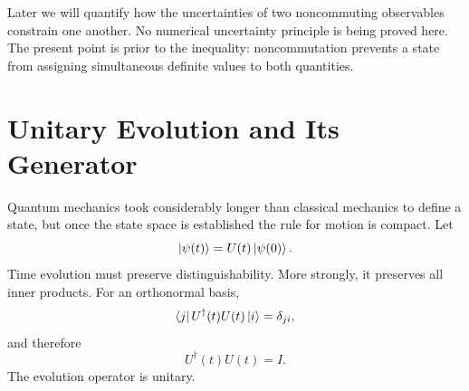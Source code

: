 Later we will quantify how the uncertainties of two noncommuting observables constrain one another. No numerical uncertainty principle is being proved here. The present point is prior to the inequality: noncommutation prevents a state from assigning simultaneous definite values to both quantities.

\begin{classroomqa}
\end{classroomqa}

\begin{classroomqa}
\end{classroomqa}

\section{Unitary Evolution and Its Generator}

Quantum mechanics took considerably longer than classical mechanics to define a state, but once the state space is established the rule for motion is compact. Let
\begin{equation}
\left\lvert\psi(t)\right\rangle=U(t)\left\lvert\psi(0)\right\rangle.
\label{eq:l5-propagator}
\end{equation}
Time evolution must preserve distinguishability. More strongly, it preserves all inner products. For an orthonormal basis,
\begin{equation}
\left\langle j\right\rvert U^\dagger(t)U(t)\left\lvert i\right\rangle=\delta_{ji},
\end{equation}
and therefore
\begin{equation}
U^\dagger(t)U(t)=I.
\label{eq:l5-unitarity}
\end{equation}
The evolution operator is unitary.

